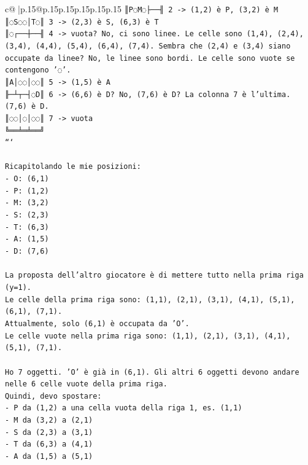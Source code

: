 \documentclass{article}
\begin{document}
{\begin{supertabular}{c@{$\;$}|p{.15\linewidth}@{}p{.15\linewidth}p{.15\linewidth}p{.15\linewidth}p{.15\linewidth}p{.15\linewidth}}
{{{\texttt{║P◌M◌├──╢ 2  {-}> (1,2) è P, (3,2) è M} \\
\texttt{║◌S◌◌│T◌║ 3  {-}> (2,3) è S, (6,3) è T} \\
\texttt{║◌┌──┼──╢ 4  {-}> vuota? No, ci sono linee. Le celle sono (1,4), (2,4), (3,4), (4,4), (5,4), (6,4), (7,4). Sembra che (2,4) e (3,4) siano occupate da linee? No, le linee sono bordi. Le celle sono vuote se contengono '◌'.} \\
\texttt{║A│◌◌│◌◌║ 5  {-}> (1,5) è A} \\
\texttt{╟─┴┬─┤◌D║ 6  {-}> (6,6) è D? No, (7,6) è D? La colonna 7 è l'ultima. (7,6) è D.} \\
\texttt{║◌◌│◌│◌◌║ 7  {-}> vuota} \\
\texttt{╚══╧═╧══╝} \\
\texttt{```} \\
\\ 
\texttt{Ricapitolando le mie posizioni:} \\
\texttt{{-} O: (6,1)} \\
\texttt{{-} P: (1,2)} \\
\texttt{{-} M: (3,2)} \\
\texttt{{-} S: (2,3)} \\
\texttt{{-} T: (6,3)} \\
\texttt{{-} A: (1,5)} \\
\texttt{{-} D: (7,6)} \\
\\ 
\texttt{La proposta dell'altro giocatore è di mettere tutto nella prima riga (y=1).} \\
\texttt{Le celle della prima riga sono: (1,1), (2,1), (3,1), (4,1), (5,1), (6,1), (7,1).} \\
\texttt{Attualmente, solo (6,1) è occupata da 'O'.} \\
\texttt{Le celle vuote nella prima riga sono: (1,1), (2,1), (3,1), (4,1), (5,1), (7,1).} \\
\\ 
\texttt{Ho 7 oggetti. 'O' è già in (6,1). Gli altri 6 oggetti devono andare nelle 6 celle vuote della prima riga.} \\
\texttt{Quindi, devo spostare:} \\
\texttt{{-} P da (1,2) a una cella vuota della riga 1, es. (1,1)} \\
\texttt{{-} M da (3,2) a (2,1)} \\
\texttt{{-} S da (2,3) a (3,1)} \\
\texttt{{-} T da (6,3) a (4,1)} \\
\texttt{{-} A da (1,5) a (5,1)} \\
}}}
\end{supertabular}}
\end{document}
